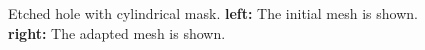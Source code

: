 \begin{figure}[!ht]
   \subfloat%
   {
   }
   \subfloat%
   {
   }
   \caption{Etched hole with cylindrical mask.\newline 
   \textbf{left:} The initial mesh is shown. \textbf{right:} The adapted mesh is shown.}
\end{figure}

